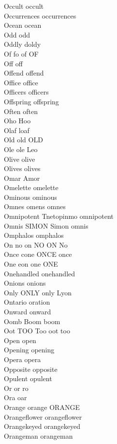 Occult occult\\
Occurrences occurrences\\
Ocean ocean\\
Odd odd\\
Oddly doldy\\
Of fo of OF\\
Off off\\
Offend offend\\
Office office\\
Officers officers\\
Offspring offspring\\
Often often\\
Oho Hoo\\
Olaf loaf\\
Old old OLD\\
Ole ole Leo\\
Olive olive\\
Olives olives\\
Omar Amor\\
Omelette omelette\\
Ominous ominous\\
Omnes omens omnes\\
Omnipotent Tnetopinmo omnipotent\\
Omnis SIMON Simon omnis\\
Omphalos omphalos\\
On no on NO ON No\\
Once cone ONCE once\\
One eon one ONE\\
Onehandled onehandled\\
Onions onions\\
Only ONLY only Lyon\\
Ontario oration\\
Onward onward\\
Oomb Boom boom\\
Oot TOO Too oot too\\
Open open\\
Opening opening\\
Opera opera\\
Opposite opposite\\
Opulent opulent\\
Or or ro\\
Ora oar\\
Orange orange ORANGE\\
Orangeflower orangeflower\\
Orangekeyed orangekeyed\\
Orangeman orangeman\\
